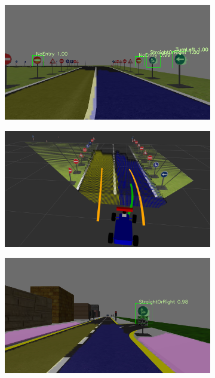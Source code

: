 \begin{figure}[h]
  \centering
  \begin{subfigure}[b]{0.45\linewidth}
      \includegraphics[width=\linewidth]{figures/experiments/lane-following-img.png}
  \end{subfigure}
  \begin{subfigure}[b]{0.45\linewidth}
      \includegraphics[width=\linewidth]{figures/experiments/lane-following-pc.png}
  \end{subfigure}
  \begin{subfigure}[b]{0.45\linewidth}
      \includegraphics[width=\linewidth]{figures/experiments/straight-or-right-img.png}

\end{subfigure}
\end{figure}
